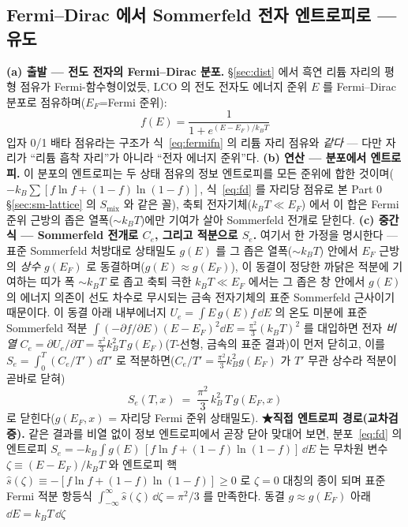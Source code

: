 \subsection{Fermi--Dirac 에서 Sommerfeld 전자 엔트로피로 --- 유도}\label{sec:lco-Se}
\textbf{(a) 출발 --- 전도 전자의 Fermi--Dirac 분포.} \S\ref{sec:dist} 에서 흑연 리튬 자리의 평형 점유가 Fermi-함수형이었듯, LCO 의 전도 전자도 에너지 준위 $E$ 를
Fermi--Dirac 분포로 점유하며($E_F$=Fermi 준위):
\begin{equation}
f(E)=\frac{1}{1+e^{(E-E_F)/k_BT}}
\label{eq:fd}
\end{equation}
입자 0/1 배타 점유라는 구조가 식~\eqref{eq:fermifn} 의 리튬 자리 점유와 \emph{같다} --- 다만 자리가 ``리튬 흡착
자리''가 아니라 ``전자 에너지 준위''다. \textbf{(b) 연산 --- 분포에서 엔트로피.} 이 분포의 엔트로피는 두 상태 점유의 정보 엔트로피를 모든 준위에 합한 것이며($-k_B\sum[f\ln f+(1-f)\ln(1-f)]$,
식~\eqref{eq:fd} 를 자리당 점유로 본 Part 0 \S\ref{sec:sm-lattice} 의 $S_\mathrm{mix}$ 와 같은 꼴), 축퇴 전자기체($k_BT\!\ll\!E_F$)
에서 이 합은 Fermi 준위 근방의 좁은 열폭($\sim k_BT$)에만 기여가 살아 Sommerfeld 전개로 닫힌다. \textbf{(c) 중간식 --- Sommerfeld 전개로 $C_e$, 그리고 적분으로 $S_e$.}
여기서 한 가정을 명시한다 --- 표준 Sommerfeld 처방대로 상태밀도 $g(E)$ 를 그 좁은 열폭($\sim k_BT$) 안에서 $E_F$
근방의 \emph{상수} $g(E_F)$ 로 동결하며($g(E)\approx g(E_F)$), 이 동결이 정당한 까닭은 적분에 기여하는 띠가 폭
$\sim k_BT$ 로 좁고 축퇴 극한 $k_BT\!\ll\!E_F$ 에서는 그 좁은 창 안에서 $g(E)$ 의 에너지 의존이 선도 차수로
무시되는 금속 전자기체의 표준 Sommerfeld 근사이기 때문이다. 이 동결 아래 내부에너지 $U_e=\int E\,g(E)f\,\dd E$ 의
온도 미분에 표준 Sommerfeld 적분 $\int(-\partial f/\partial E)(E-E_F)^2\dd E=\tfrac{\pi^2}{3}(k_BT)^2$ 를 대입하면
전자 \emph{비열} $C_e=\partial U_e/\partial T=\tfrac{\pi^2}{3}k_B^2T\,g(E_F)$($T$-선형, 금속의 표준 결과)이 먼저
닫히고, 이를 $S_e=\int_0^T (C_e/T')\,\dd T'$ 로 적분하면($C_e/T'=\tfrac{\pi^2}{3}k_B^2g(E_F)$ 가 $T'$ 무관 상수라
적분이 곧바로 닫혀)
\begin{equation}
S_e(T,x)\;=\;\frac{\pi^2}{3}\,k_B^2\,T\,g(E_F,x)
\label{eq:Se}
\end{equation}
로 닫힌다($g(E_F,x)$ = 자리당 Fermi 준위 상태밀도). \textbf{★직접 엔트로피 경로(교차검증).} 같은 결과를 비열 없이 정보 엔트로피에서 곧장 닫아 맞대어 보면, 분포~\eqref{eq:fd} 의 엔트로피
$S_e=-k_B\int g(E)\,[f\ln f+(1-f)\ln(1-f)]\,\dd E$ 는 무차원 변수 $\zeta\equiv(E-E_F)/k_BT$ 와 엔트로피 핵
$\hat s(\zeta)\equiv-[f\ln f+(1-f)\ln(1-f)]\ge0$ 로 $\zeta=0$ 대칭의 종이 되며 표준 Fermi 적분 항등식
$\int_{-\infty}^{\infty}\hat s(\zeta)\,\dd\zeta=\pi^2/3$ 를 만족한다. 동결 $g\approx g(E_F)$ 아래 $\dd E=k_BT\,\dd\zeta$

